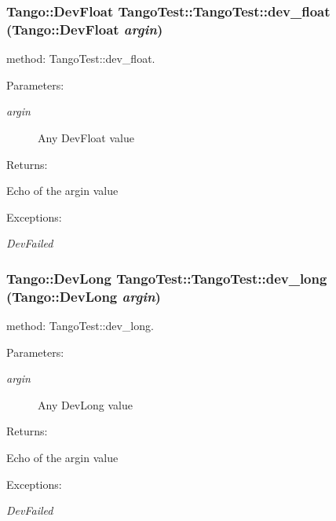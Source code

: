 \subsubsection{\setlength{\rightskip}{0pt plus 5cm}Tango::Dev\-Float Tango\-Test::Tango\-Test::dev\_\-float (Tango::Dev\-Float {\em argin})}\label{classTangoTest_1_1TangoTest_z5_9}


method: Tango\-Test::dev\_\-float.

\begin{Desc}
\item[Parameters: ]\par
\begin{description}
\item[{\em 
argin}]Any Dev\-Float value \end{description}
\end{Desc}
\begin{Desc}
\item[Returns: ]\par
Echo of the argin value \end{Desc}
\begin{Desc}
\item[Exceptions: ]\par
\begin{description}
\item[{\em 
Dev\-Failed}] \end{description}
\end{Desc}
\subsubsection{\setlength{\rightskip}{0pt plus 5cm}Tango::Dev\-Long Tango\-Test::Tango\-Test::dev\_\-long (Tango::Dev\-Long {\em argin})}\label{classTangoTest_1_1TangoTest_z5_7}


method: Tango\-Test::dev\_\-long.

\begin{Desc}
\item[Parameters: ]\par
\begin{description}
\item[{\em 
argin}]Any Dev\-Long value \end{description}
\end{Desc}
\begin{Desc}
\item[Returns: ]\par
Echo of the argin value \end{Desc}
\begin{Desc}
\item[Exceptions: ]\par
\begin{description}
\item[{\em 
Dev\-Failed}] \end{description}
\end{Desc}
